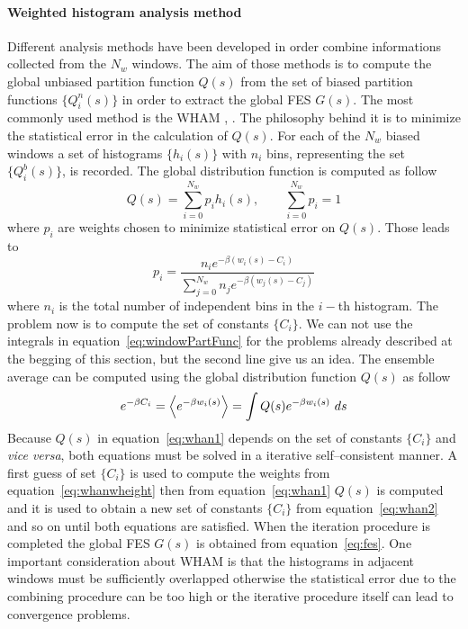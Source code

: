 \paragraph{\textbf{Weighted histogram analysis method}} Different analysis methods have been developed in order
combine informations collected from the $N_w$ windows. The aim of those methods is to compute the global unbiased
partition function $Q(s)$ from the set of biased partition functions $\{Q^n_i(s)\}$ in order to extract the
global \ac{FES} $G(s)$. The most commonly used method is the \ac{WHAM} \cite{WHAM}, \cite{gWHAM}. The philosophy
behind it is to minimize the statistical error in the calculation of $Q(s)$. For each of the $N_w$ biased windows
a set of histograms $\{h_i(s)\}$ with $n_i$ bins, representing the set $\{Q^b_i(s)\}$, is recorded. The global
distribution function is computed as follow
\begin{equation}
	Q(s) = \sum_{i=0}^{N_w} p_i h_i(s), \qquad \sum_{i=0}^{N_w} p_i = 1
	\label{eq:whan1}
\end{equation}
where $p_i$ are weights chosen to minimize statistical error on $Q(s)$. Those leads to
\begin{equation}
	p_i = \frac{n_ie^{-\beta (w_i(s) - C_i)}}{\sum_{j=0}^{N_w} n_je^{-\beta (w_j(s) - C_j)}}
	\label{eq:whanwheight}
\end{equation}
where $n_i$ is the total number of independent bins in the $i-$th histogram. The problem now is to compute the
set of constants $\{C_i\}$. We can not use the integrals in equation~\eqref{eq:windowPartFunc} for the problems
already described at the begging of this section, but the second line give us an idea. The ensemble average can
be computed using the global distribution function $Q(s)$ as follow
\begin{equation}
	e^{-\beta C_i} = \left \langle e^{-\beta w_i(s)} \right \rangle = \int Q(s) e^{-\beta w_i(s)}\ ds
	\label{eq:whan2}
\end{equation}
Because $Q(s)$ in equation~\eqref{eq:whan1} depends on the set of constants $\{C_i\}$ and \textit{vice versa},
both equations must be solved in a iterative self--consistent manner. A first guess of set $\{C_i\}$ is used to
compute the weights from equation~\eqref{eq:whanwheight} then from equation~\eqref{eq:whan1} $Q(s)$ is computed
and it is used to obtain a new set of constants $\{C_i\}$ from equation~\eqref{eq:whan2} and so on until both
equations are satisfied. When the iteration procedure is completed the global \ac{FES} $G(s)$ is obtained from
equation~\eqref{eq:fes}. One important consideration about \ac{WHAM} is that the histograms in adjacent windows
must be sufficiently overlapped otherwise the statistical error due to the combining procedure can be too high or
the iterative procedure itself can lead to convergence problems.


